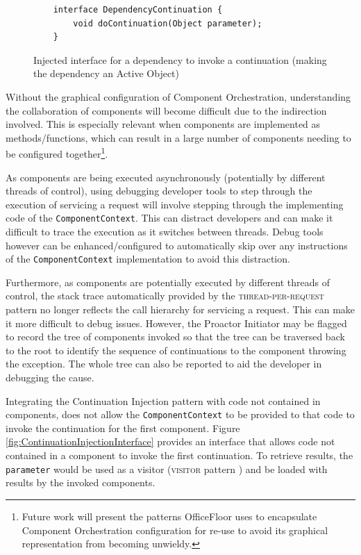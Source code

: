 \documentclass[prodmode]{style/acmlarge}
\begin{document}
\begin{figure}[tp]
\begin{verbatim}
    interface DependencyContinuation {
        void doContinuation(Object parameter);
    }
\end{verbatim}
\caption{Injected interface for a dependency to invoke a continuation (making the dependency an Active Object)}
\label{fig:DC_interface}
\end{figure}

Without the graphical configuration of Component Orchestration, understanding
the collaboration of components will become difficult due to the indirection
involved.  This is especially relevant when components are implemented as
methods/functions, which can result in a large number of components needing to
be configured together\footnote{Future work will present the patterns
OfficeFloor \cite{officefloor} uses to encapsulate Component Orchestration
configuration for re-use to avoid its graphical representation from becoming
unwieldy.}.

As components are being executed asynchronously (potentially by different
threads of control), using debugging developer tools to step through the
execution of servicing a request will involve stepping through the implementing
code of the \texttt{ComponentContext}.  This can distract developers and can
make it difficult to trace the execution as it switches between threads. 
Debug tools however can be enhanced/configured to automatically skip over any
instructions of the \texttt{ComponentContext} implementation to avoid this
distraction.

Furthermore, as components are potentially executed by different threads of
control, the stack trace automatically provided by the
\textsc{thread-per-request} pattern no longer reflects the call hierarchy for
servicing a request.  This can make it more difficult to debug issues.  However,
the Proactor Initiator may be flagged to record the tree of components invoked
so that the tree can be traversed back to the root to identify the sequence of
continuations to the component throwing the exception.  The whole tree can also
be reported to aid the developer in debugging the cause.

Integrating the Continuation Injection pattern with code not contained in
components, does not allow the \texttt{ComponentContext} to be provided to that
code to invoke the continuation for the first component.  Figure
\ref{fig:ContinuationInjectionInterface} provides an interface that allows code
not contained in a component to invoke the first continuation.  To retrieve
results, the \texttt{parameter} would be used as a visitor (\textsc{visitor}
pattern \cite{gof}) and be loaded with results by the invoked components.
\end{document}
